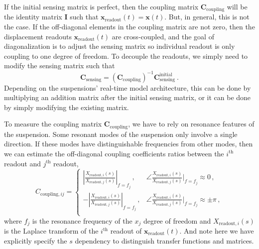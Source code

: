 If the initial sensing matrix is perfect, then the coupling matrix $\mathbf{C}_\mathrm{coupling}$ will be the identity matrix $\mathbf{I}$ such that $\mathbf{x}_\mathrm{readout}(t)=\mathbf{x}(t)$.
But, in general, this is not the case.
If the off-diagonal elements in the coupling matrix are not zero, then the displacement readouts $\mathbf{x}_\mathrm{readout}(t)$ are cross-coupled, and the goal of diagonalization is to adjust the sensing matrix so individual readout is only coupling to one degree of freedom.
To decouple the readouts, we simply need to modify the sensing matrix such that
\begin{equation}
	\boxed{
		\mathbf{C}_\mathrm{sensing} = \left(\mathbf{C}_\mathrm{coupling}\right)^{-1} \mathbf{C}_\mathrm{sensing}^\mathrm{initial}
}\ .
	\label{eqn:sensing_matrix_diagonalization}
\end{equation}
Depending on the suspensions' real-time model architecture, this can be done by multiplying an addition matrix after the initial sensing matrix, or it can be done by simply modifying the existing matrix.

To measure the coupling matrix $\mathbf{C}_\mathrm{coupling}$, we have to rely on resonance features of the suspension.
Some resonant modes of the suspension only involve a single direction.
If these modes have distinguishable frequencies from other modes, then we can estimate the off-diagonal coupling coefficients ratios between the $i^\mathrm{th}$ readout and $j^\mathrm{th}$ readout,
\begin{equation}
	\boxed{
		C_{\mathrm{coupling}, ij}=
		\begin{cases}
			\left\lvert\frac{X_{\mathrm{readout}, i}(s)}{X_{\mathrm{readout}, j}(s)}\right\rvert_{f=f_j}\,, & \angle\frac{X_{\mathrm{readout}, i}(s)}{X_{\mathrm{readout}, j}(s)}\Big\vert_{f=f_j}\approx 0\,,\\
			-\left\lvert\frac{X_{\mathrm{readout}, i}(s)}{X_{\mathrm{readout}, j}(s)}\right\rvert_{f=f_j}\,, & \angle\frac{X_{\mathrm{readout}, i}(s)}{X_{\mathrm{readout}, j}(s)}\Big\rvert_{f=f_j}\approx \pm \pi\,,\\
		\end{cases}
	}
\end{equation}
where $f_j$ is the resonance frequency of the $x_j$ degree of freedom and $X_{\mathrm{readout},i}(s)$ is the Laplace transform of the $i^\mathrm{th}$ readout of $\mathbf{x}_\mathrm{readout}(t)$.
And note here we have explicitly specify the $s$ dependency to distinguish transfer functions and matrices.

